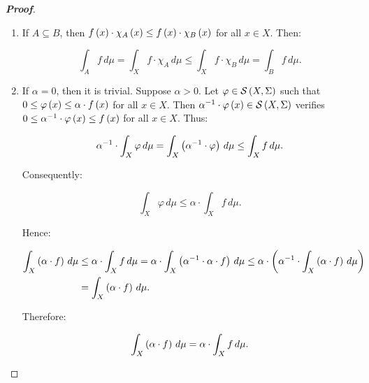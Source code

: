 \begin{proposition}
\begin{proof}[\rm\textbf{Proof}]
\begin{enumerate}
      Therefore:

      \begin{equation}
        \int_{X}{f\,d\mu}\leq\int_{X}{g\,d\mu}.
      \end{equation}
      \item If $A\subseteq B$, then $f\left(x\right)\cdot\chi_A\left(x\right)\leq f\left(x\right)\cdot\chi_B\left(x\right)$ for all $x\in X$. Then:
      
      \begin{equation}
        \int_{A}{f\,d\mu}=\int_{X}{f\cdot\chi_A\,d\mu}\leq\int_{X}{f\cdot\chi_B\,d\mu}=\int_{B}{f\,d\mu}.
      \end{equation}
      \item If $\alpha=0$, then it is trivial. Suppose $\alpha>0$. Let $\varphi\in\mathcal{S}\left(X,\Sigma\right)$ such that $0\leq\varphi\left(x\right)\leq\alpha\cdot f\left(x\right)$ for all $x\in X$. Then $\alpha^{-1}\cdot\varphi\left(x\right)\in\mathcal{S}\left(X,\Sigma\right)$ verifies $0\leq\alpha^{-1}\cdot\varphi\left(x\right)\leq f\left(x\right)$ for all $x\in X$. Thus:
      
      \begin{equation}
        \alpha^{-1}\cdot\int_{X}{\varphi\,d\mu}=\int_{X}{\left(\alpha^{-1}\cdot\varphi\right)\,d\mu}\leq\int_{X}{f\,d\mu}.
      \end{equation}

      Consequently:

      \begin{equation}
        \int_{X}{\varphi\,d\mu}\leq\alpha\cdot\int_{X}{f\,d\mu}.
      \end{equation}

      Hence:

      \begin{equation}
        \begin{split}
          \int_{X}{\left(\alpha\cdot f\right)\,d\mu}&\leq\alpha\cdot\int_{X}{f\,d\mu}=\alpha\cdot\int_{X}{\left(\alpha^{-1}\cdot\alpha\cdot f\right)\,d\mu}\leq\alpha\cdot\left(\alpha^{-1}\cdot\int_{X}{\left(\alpha\cdot f\right)\,d\mu}\right)\\
          & =\int_{X}{\left(\alpha\cdot f\right)\,d\mu}.
        \end{split}
      \end{equation}

      Therefore:

      \begin{equation}
        \int_{X}{\left(\alpha\cdot f\right)\,d\mu}=\alpha\cdot\int_{X}{f\,d\mu}.
      \end{equation}


\end{enumerate}
\end{proof}
\end{proposition}
